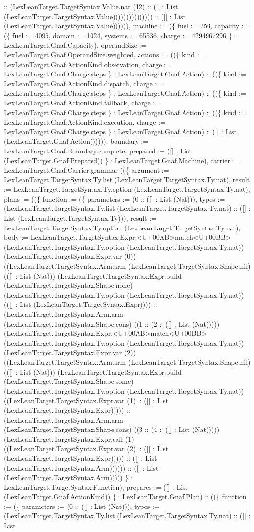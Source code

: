 \documentclass[11pt]{article}
\begin{document}
:: (LexLeanTarget.TargetSyntax.Value.nat (12) :: ([] : List (LexLeanTarget.TargetSyntax.Value))))))))))))))) :: ([] : List (LexLeanTarget.TargetSyntax.Value)))))), machine := (\{ fuel := 256, capacity := (\{ fuel := 4096, domain := 1024, systems := 65536, charge := 4294967296 \} : LexLeanTarget.Gnaf.Capacity), operandSize := LexLeanTarget.Gnaf.OperandSize.weighted, actions := ((\{ kind := LexLeanTarget.Gnaf.ActionKind.observation, charge := LexLeanTarget.Gnaf.Charge.steps \} : LexLeanTarget.Gnaf.Action) :: ((\{ kind := LexLeanTarget.Gnaf.ActionKind.dispatch, charge := LexLeanTarget.Gnaf.Charge.steps \} : LexLeanTarget.Gnaf.Action) :: ((\{ kind := LexLeanTarget.Gnaf.ActionKind.fallback, charge := LexLeanTarget.Gnaf.Charge.steps \} : LexLeanTarget.Gnaf.Action) :: ((\{ kind := LexLeanTarget.Gnaf.ActionKind.execution, charge := LexLeanTarget.Gnaf.Charge.steps \} : LexLeanTarget.Gnaf.Action) :: ([] : List (LexLeanTarget.Gnaf.Action)))))), boundary := LexLeanTarget.Gnaf.Boundary.complete, prepared := ([] : List (LexLeanTarget.Gnaf.Prepared)) \} : LexLeanTarget.Gnaf.Machine), carrier := LexLeanTarget.Gnaf.Carrier.grammar ((\{ argument := LexLeanTarget.TargetSyntax.Ty.list (LexLeanTarget.TargetSyntax.Ty.nat), result := LexLeanTarget.TargetSyntax.Ty.option (LexLeanTarget.TargetSyntax.Ty.nat), plans := ((\{ function := (\{ parameters := (0 :: ([] : List (Nat))), types := (LexLeanTarget.TargetSyntax.Ty.list (LexLeanTarget.TargetSyntax.Ty.nat) :: ([] : List (LexLeanTarget.TargetSyntax.Ty))), result := LexLeanTarget.TargetSyntax.Ty.option (LexLeanTarget.TargetSyntax.Ty.nat), body := LexLeanTarget.TargetSyntax.Expr.<U+00AB>match<U+00BB> (LexLeanTarget.TargetSyntax.Ty.option (LexLeanTarget.TargetSyntax.Ty.nat)) (LexLeanTarget.TargetSyntax.Expr.var (0)) ((LexLeanTarget.TargetSyntax.Arm.arm (LexLeanTarget.TargetSyntax.Shape.nil) (([] : List (Nat))) (LexLeanTarget.TargetSyntax.Expr.build (LexLeanTarget.TargetSyntax.Shape.none) (LexLeanTarget.TargetSyntax.Ty.option (LexLeanTarget.TargetSyntax.Ty.nat)) (([] : List (LexLeanTarget.TargetSyntax.Expr)))) :: (LexLeanTarget.TargetSyntax.Arm.arm (LexLeanTarget.TargetSyntax.Shape.cons) ((1 :: (2 :: ([] : List (Nat))))) (LexLeanTarget.TargetSyntax.Expr.<U+00AB>match<U+00BB> (LexLeanTarget.TargetSyntax.Ty.option (LexLeanTarget.TargetSyntax.Ty.nat)) (LexLeanTarget.TargetSyntax.Expr.var (2)) ((LexLeanTarget.TargetSyntax.Arm.arm (LexLeanTarget.TargetSyntax.Shape.nil) (([] : List (Nat))) (LexLeanTarget.TargetSyntax.Expr.build (LexLeanTarget.TargetSyntax.Shape.some) (LexLeanTarget.TargetSyntax.Ty.option (LexLeanTarget.TargetSyntax.Ty.nat)) ((LexLeanTarget.TargetSyntax.Expr.var (1) :: ([] : List (LexLeanTarget.TargetSyntax.Expr))))) :: (LexLeanTarget.TargetSyntax.Arm.arm (LexLeanTarget.TargetSyntax.Shape.cons) ((3 :: (4 :: ([] : List (Nat))))) (LexLeanTarget.TargetSyntax.Expr.call (1) ((LexLeanTarget.TargetSyntax.Expr.var (2) :: ([] : List (LexLeanTarget.TargetSyntax.Expr))))) :: ([] : List (LexLeanTarget.TargetSyntax.Arm)))))) :: ([] : List (LexLeanTarget.TargetSyntax.Arm))))) \} : LexLeanTarget.TargetSyntax.Function), prepares := ([] : List (LexLeanTarget.Gnaf.ActionKind)) \} : LexLeanTarget.Gnaf.Plan) :: ((\{ function := (\{ parameters := (0 :: ([] : List (Nat))), types := (LexLeanTarget.TargetSyntax.Ty.list (LexLeanTarget.TargetSyntax.Ty.nat) :: ([] : List 
\end{document}
